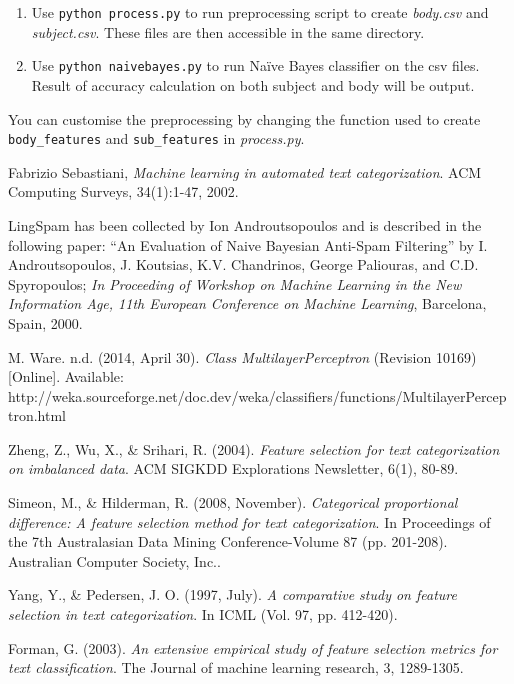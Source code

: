 \documentclass[10pt, a4paper]{article}
\begin{document}
\begin{enumerate}
\item Use \verb|python process.py| to run preprocessing script to create \textit{body.csv} and \textit{subject.csv}. These files are then accessible in the same directory. 
\item Use \verb|python naivebayes.py| to run Na\"ive Bayes classifier on the csv files. Result of accuracy calculation on both subject and body will be output.
\end{enumerate}

You can customise the preprocessing by changing the function used to create \verb|body_features| and \verb|sub_features| in \textit{process.py}.

\begin{thebibliography}{9}

  Fabrizio Sebastiani, \emph{Machine learning in automated text categorization}. ACM Computing Surveys, 34(1):1-47, 2002.

LingSpam has been collected by Ion Androutsopoulos and is described in the following paper: ``An Evaluation of Naive Bayesian Anti-Spam Filtering'' by I. Androutsopoulos, J. Koutsias, K.V. Chandrinos, George Paliouras, and C.D. Spyropoulos; \textit{In Proceeding of Workshop on Machine Learning in the New Information Age, 11th European Conference on Machine Learning}, Barcelona, Spain, 2000.

M. Ware. n.d. (2014, April 30). \emph{Class MultilayerPerceptron} (Revision 10169) [Online]. Available: http://weka.sourceforge.net/doc.dev/weka/classifiers/functions/MultilayerPerceptron.html

Zheng, Z., Wu, X., \& Srihari, R. (2004). \emph{Feature selection for text categorization on imbalanced data}. ACM SIGKDD Explorations Newsletter, 6(1), 80-89.

Simeon, M., \& Hilderman, R. (2008, November). \emph{Categorical proportional difference: A feature selection method for text categorization}. In Proceedings of the 7th Australasian Data Mining Conference-Volume 87 (pp. 201-208). Australian Computer Society, Inc..

Yang, Y., \& Pedersen, J. O. (1997, July). \emph{A comparative study on feature selection in text categorization}. In ICML (Vol. 97, pp. 412-420).

Forman, G. (2003). \emph{An extensive empirical study of feature selection metrics for text classification}. The Journal of machine learning research, 3, 1289-1305.

\end{thebibliography}
\end{document}
